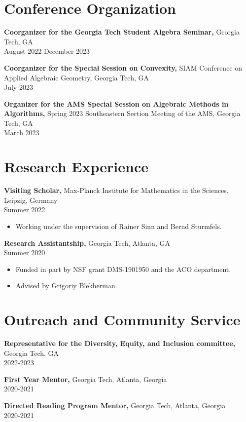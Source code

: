 \documentclass[margin]{res}
\begin{document}
\begin{resume}
\section{Conference Organization}
{\bf Coorganizer for the Georgia Tech Student Algebra Seminar,} Georgia Tech, GA    \\       August 2022-December 2023

{\bf Coorganizer for the Special Session on Convexity,} SIAM Conference on Applied Algebraic Geometry, Georgia Tech, GA    \\       July 2023

{\bf Organizer for the AMS Special Session on Algebraic Methods in Algorithms,} Spring 2023 Southeastern Section Meeting of the AMS, Georgia Tech, GA    \\       March 2023

\section{Research Experience}
{\bf Visiting Scholar,} Max-Planck Institute for Mathematics in the Sciences, Leipzig, Germany \\ Summer 2022
\begin{itemize} \itemsep -2pt %
\item Working under the supervision of Rainer Sinn and Bernd Sturmfels.
\end{itemize}
{\bf Research Assistantship,} Georgia Tech, Atlanta, GA \\ Summer 2020
\begin{itemize} \itemsep -2pt %
\item Funded in part by NSF grant DMS-1901950 and the ACO department.
\item Advised by Grigoriy Blekherman.
\end{itemize}

\section{Outreach and Community Service} 
       {\bf Representative for the Diversity, Equity, and Inclusion committee,} Georgia Tech, GA    \\         2022-2023

       {\bf First Year Mentor,} Georgia Tech, Atlanta, Georgia     \\         2020-2021 

       {\bf Directed Reading Program Mentor,} Georgia Tech, Atlanta, Georgia     \\         2020-2021 


\end{resume}
\end{document}
